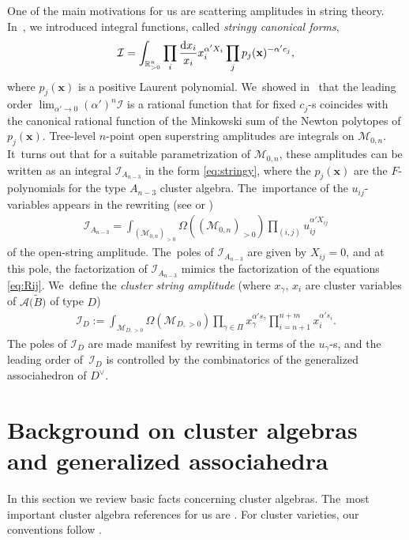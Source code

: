 \documentclass[10pt,a4paper]{amsart}
\def\R{{\mathbb R}}
\def\A{{\mathcal{A}}}
\def\tB{{\tilde B}}
\def\I{{\mathcal{I}}}
\def\M{{\mathcal{M}}}
\def\tB{{\tilde B}}
\def\x{{\mathbf x}}
\numberwithin{equation}{section}
\begin{document}
\bigskip{} One of the main motivations for us are scattering amplitudes in string theory. In~\cite{AHL}, we introduced integral functions, called {\it stringy canonical forms},
\begin{gather}\label{eq:stringy}
\I = \int_{\R_{>0}^n} \prod_i \frac{{\rm d}x_i}{x_i} x_i^{\alpha' X_i} \prod_j p_j(\x)^{-\alpha' c_j},
\end{gather}
{\sloppy
where $p_j(\x)$ is a positive Laurent polynomial. We~showed in~\cite{AHL} that the leading order
 $\lim_{\alpha' \to 0} (\alpha')^n \I$ is a rational function that for fixed $c_j$-s coincides with the canonical rational function \cite{ABL} of the Minkowski sum of the Newton polytopes of $p_j(\x)$. Tree-level $n$-point open superstring amplitudes are integrals on $\M_{0,n}$. It~turns out that for a suitable parametrization of $\M_{0,n}$, these amplitudes can be written as an integral $\I_{A_{n-3}}$ in the form \eqref{eq:stringy}, where the $p_j(\x)$ are the $F$-polynomials for the type $A_{n-3}$ cluster algebra. The~importance of the $u_{ij}$-variables appears in the rewriting (see \cite[Section~9]{AHL} or \cite[Section~3]{BD})
\begin{gather*}
\I_{A_{n-3}} = \int_{(\M_{0,n})_{>0}} \Omega((\M_{0,n})_{>0}) \prod_{(i,j)} u_{ij}^{\alpha' X_{ij}}
\end{gather*}}\noindent
of the open-string amplitude. The~poles of $\I_{A_{n-3}}$ are given by $X_{ij} = 0$, and at this pole, the factorization of $\I_{A_{n-3}}$ mimics the factorization of the equations \eqref{eq:Rij}. We~define the \emph{cluster string amplitude} (where $x_\gamma$, $x_i$ are cluster variables of $\A\big(\tB\big)$ of type $D$)
\begin{gather*}
\I_D:= \int_{\M_{D,>0}} \Omega(\M_{D,>0}) \prod_{\gamma \in \Pi} x_\gamma^{\alpha' s_\gamma} \prod_{i=n+1}^{n+m} x_i^{\alpha' s_i}.
\end{gather*}
The poles of $\I_D$ are made manifest by rewriting in terms of the $u_\gamma$-s, and the leading order of~$\I_D$ is controlled by the combinatorics of the generalized associahedron of $D^\vee$.

\section{Background on cluster algebras and generalized associahedra}
In this section we review basic facts concerning cluster algebras. The~most important cluster algebra references for us are \cite{BDMTY,YZ}. For cluster varieties, our conventions follow \cite{LS}.
\end{document}
